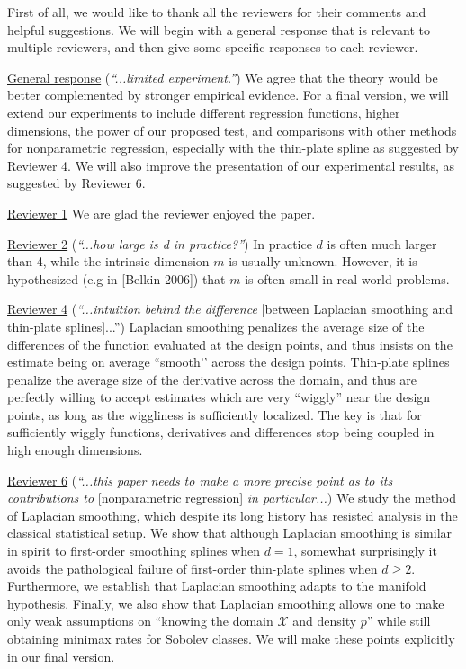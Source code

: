 \documentclass{article}
\begin{document}
First of all, we would like to thank all the reviewers for their comments and helpful suggestions. We will begin with a general response that is relevant to multiple reviewers, and then give some specific responses to each reviewer.

\underline{General response} (\textit{``...limited experiment.''}) We agree that the theory would be better complemented by stronger empirical evidence. For a final version, we will extend our experiments to include different regression functions, higher dimensions, the power of our proposed test, and comparisons with other methods for nonparametric regression, especially with the thin-plate spline as suggested by Reviewer 4. We will also improve the presentation of our experimental results, as suggested by Reviewer 6. 

\underline{Reviewer 1}
We are glad the reviewer enjoyed the paper.

\underline{Reviewer 2} (\textit{``...how large is d in practice?''}) In practice $d$ is often much larger than 4, while the intrinsic dimension $m$ is usually unknown. However, it is hypothesized (e.g in [Belkin 2006]) that $m$ is often small in real-world problems. 

\underline{Reviewer 4}
(\textit{``...intuition behind the difference} [between Laplacian smoothing and thin-plate splines]...'') Laplacian smoothing penalizes the average size of the differences of the function evaluated at the design points, and thus insists on the estimate being on average ``smooth’’ across the design points. Thin-plate splines penalize the average size of the derivative across the domain, and thus are perfectly willing to accept estimates which are very ``wiggly'' near the design points, as long as the wiggliness is sufficiently localized. The key is that for sufficiently wiggly functions, derivatives and differences stop being coupled in high enough dimensions.

\underline{Reviewer 6} (\textit{``...this paper needs to make a more precise point as to its contributions to} [nonparametric regression] \textit{in particular...}) We study the method of Laplacian smoothing, which despite its long history has resisted analysis in the classical statistical setup. We show that although Laplacian smoothing is similar in spirit to first-order smoothing splines when $d = 1$, somewhat surprisingly it avoids the pathological failure of first-order thin-plate splines when $d \geq 2$. Furthermore, we establish that Laplacian smoothing adapts to the manifold hypothesis. Finally, we also show that Laplacian smoothing allows one to make only weak assumptions on “knowing the domain $\mathcal{X}$ and density $p$” while still obtaining minimax rates for Sobolev classes. We will make these points explicitly in our final version.
\end{document}
